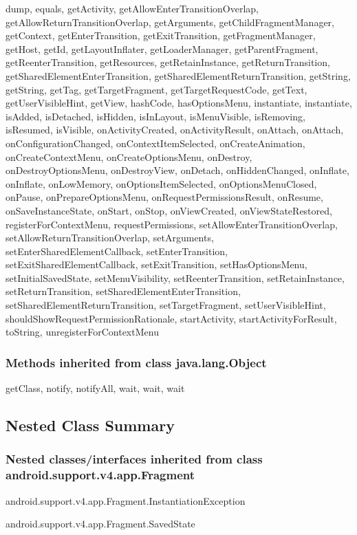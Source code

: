 dump, equals, getActivity, getAllowEnterTransitionOverlap, getAllowReturnTransitionOverlap, getArguments, getChildFragmentManager, getContext, getEnterTransition, getExitTransition, getFragmentManager, getHost, getId, getLayoutInflater, getLoaderManager, getParentFragment, getReenterTransition, getResources, getRetainInstance, getReturnTransition, getSharedElementEnterTransition, getSharedElementReturnTransition, getString, getString, getTag, getTargetFragment, getTargetRequestCode, getText, getUserVisibleHint, getView, hashCode, hasOptionsMenu, instantiate, instantiate, isAdded, isDetached, isHidden, isInLayout, isMenuVisible, isRemoving, isResumed, isVisible, onActivityCreated, onActivityResult, onAttach, onAttach, onConfigurationChanged, onContextItemSelected, onCreateAnimation, onCreateContextMenu, onCreateOptionsMenu, onDestroy, onDestroyOptionsMenu, onDestroyView, onDetach, onHiddenChanged, onInflate, onInflate, onLowMemory, onOptionsItemSelected, onOptionsMenuClosed, onPause, onPrepareOptionsMenu, onRequestPermissionsResult, onResume, onSaveInstanceState, onStart, onStop, onViewCreated, onViewStateRestored, registerForContextMenu, requestPermissions, setAllowEnterTransitionOverlap, setAllowReturnTransitionOverlap, setArguments, setEnterSharedElementCallback, setEnterTransition, setExitSharedElementCallback, setExitTransition, setHasOptionsMenu, setInitialSavedState, setMenuVisibility, setReenterTransition, setRetainInstance, setReturnTransition, setSharedElementEnterTransition, setSharedElementReturnTransition, setTargetFragment, setUserVisibleHint, shouldShowRequestPermissionRationale, startActivity, startActivityForResult, toString, unregisterForContextMenu\\

\subsubsection{Methods inherited from class java.lang.Object}

getClass, notify, notifyAll, wait, wait, wait\\





\subsection{Nested Class Summary}

\subsubsection{Nested classes/interfaces inherited from class android.support.v4.app.Fragment}
\begin{DoxyCompactItemize}
\item android.support.v4.app.Fragment.InstantiationException
\item android.support.v4.app.Fragment.SavedState
\end{DoxyCompactItemize} 


